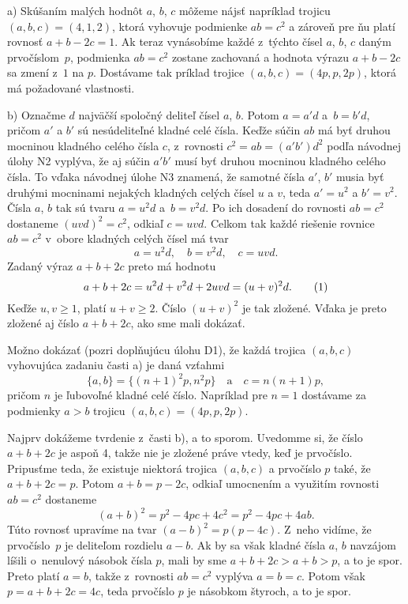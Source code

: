 {%
a) Skúšaním malých hodnôt $a$, $b$, $c$ môžeme nájsť napríklad
trojicu $(a,b,c)=(4,1,2)$, ktorá vyhovuje podmienke $ab=c^2$ a
zároveň pre ňu platí rovnosť $a+b-2c=1$. Ak teraz vynásobíme každé
z~týchto čísel $a$, $b$, $c$ daným prvočíslom~$p$, podmienka $ab=c^2$
zostane zachovaná a hodnota výrazu $a+b-2c$ sa zmení
z~$1$ na $p$. Dostávame tak príklad trojice $(a,b,c)=(4p,p,2p)$,
ktorá má požadované vlastnosti.
\smallskip

b) Označme $d$ najväčší spoločný deliteľ čísel $a$, $b$.
Potom $a = a'd$ a~$b=b'd$, pričom $a'$ a $b'$ sú nesúdeliteľné kladné celé čísla.
Keďže súčin $ab$ má byť druhou mocninou kladného celého čísla $c$,
z~rovnosti $c^2=ab=(a'b')d^2$ podľa návodnej úlohy N2 vyplýva,
že aj súčin $a'b'$ musí byť druhou mocninou kladného celého čísla. To
vďaka návodnej úlohe N3 znamená, že samotné čísla $a'$, $b'$ musia byť
druhými mocninami nejakých kladných celých čísel $u$ a $v$,
teda $a'=u^2$ a $b'=v^2$. Čísla $a$, $b$ tak sú tvaru $a=u^2d$
a~$b=v^2d$. Po ich dosadení do rovnosti $ab=c^2$ dostaneme $(uvd)^2=c^2$,
odkiaľ $c=uvd$. Celkom tak každé riešenie rovnice $ab=c^2$ v~obore
kladných celých čísel má tvar
$$
a = u^2d, \quad b = v^2d, \quad c = uvd.
$$
Zadaný výraz $a+b+2c$ preto má hodnotu
$$
a+b+2c =u^2d + v^2d + 2uvd = (u+v)^2d.
\tag1
$$
Keďže $u,v\geq1$, platí $u+v\geq 2$. Číslo $(u+v)^2$ je tak
zložené. Vďaka  je preto zložené aj číslo $a+b+2c$,
ako sme mali dokázať.

\poznamka
Možno dokázať (pozri doplňujúcu úlohu D1), že každá trojica $(a,b,c)$
vyhovujúca zadaniu časti a) je daná vzťahmi
$$
\{a,b\}=\{(n+1)^2 p,n^2 p\}\quad\text{a}\quad c=n(n+1)p,
$$
pričom $n$ je ľubovoľné kladné celé číslo. Napríklad pre $n=1$
dostávame za podmienky $a>b$ trojicu $(a,b,c)=(4p,p,2p)$.

\ineriesenie
Najprv dokážeme tvrdenie z~časti b), a to sporom. Uvedomme si, že
číslo $a+b+2c$ je aspoň 4, takže nie je zložené práve vtedy, keď je prvočíslo.
Pripusťme teda, že existuje niektorá trojica $(a,b,c)$ a prvočíslo $p$ také,
že $a+b+2c=p$. Potom $a+b=p-2c$, odkiaľ
umocnením a využitím rovnosti $ab=c^2$ dostaneme
$$
(a+b)^2=p^2-4pc+4c^2=p^2-4pc+4ab.
$$
Túto rovnosť upravíme na tvar $(a-b)^2=p(p-4c)$. Z~neho vidíme,
že prvočíslo~$p$ je deliteľom rozdielu $a-b$. Ak by sa však
kladné čísla $a$, $b$ navzájom líšili o~nenulový násobok čísla $p$,
mali by sme $a+b+2c>a+b>p$, a to je spor. Preto platí $a=b$, takže z~rovnosti
$ab=c^2$ vyplýva $a=b=c$. Potom však $p=a+b+2c=4c$, teda prvočíslo $p$
je násobkom štyroch, a to je spor.

}
